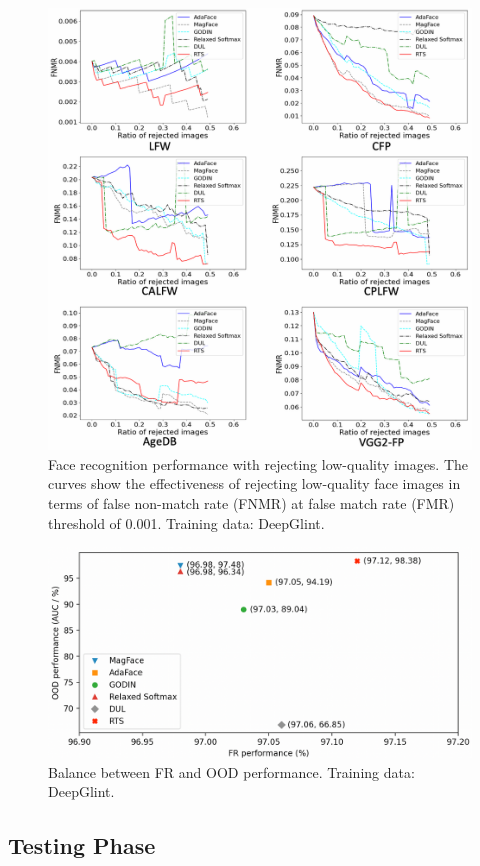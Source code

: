 \documentclass[letterpaper]{article} %
\begin{document}
\begin{figure}[t]
\centering
\includegraphics[width=0.8\linewidth]{figures/rej_fr_curve_adaface_large_all_legend.png}
\caption{Face recognition performance with rejecting low-quality images. The curves show the effectiveness of rejecting low-quality face images in terms of false non-match rate (FNMR) at false match rate (FMR) threshold of 0.001. Training data: DeepGlint.}
\label{fig:rej_fr_curve}
\end{figure}


\begin{figure}[t]
\centering
\includegraphics[width=0.72\linewidth]{figures/FR-OOD_small2.png}
\caption{Balance between FR and OOD performance. Training data: DeepGlint.}
\label{fig:FR-OOD}
\end{figure}



\subsection{Testing Phase}
\label{ssec:testing phase}
\end{document}

